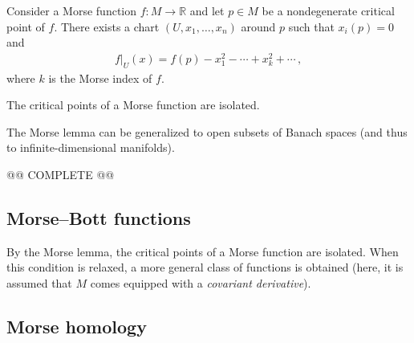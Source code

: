     \begin{property}
        Consider a Morse function $f:M\rightarrow\mathbb{R}$ and let $p\in M$ be a nondegenerate critical point of $f$. There exists a chart $(U,x_1,\ldots,x_n)$ around $p$ such that $x_i(p)=0$ and
        \begin{gather}
            f|_U(x) = f(p) - x_1^2-\cdots + x_k^2+\cdots\,,
        \end{gather}
        where $k$ is the Morse index of $f$.
    \end{property}
    \begin{result}
        The critical points of a Morse function are isolated.
    \end{result}
    \begin{remark}
        The Morse lemma can be generalized to open subsets of Banach spaces (and thus to infinite-dimensional manifolds).
    \end{remark}


    @@ COMPLETE @@

\subsection{Morse--Bott functions}

    By the Morse lemma, the critical points of a Morse function are isolated. When this condition is relaxed, a more general class of functions is obtained (here, it is assumed that $M$ comes equipped with a \textit{covariant derivative}).

\subsection{Morse homology}\label{section:morse_homology}


